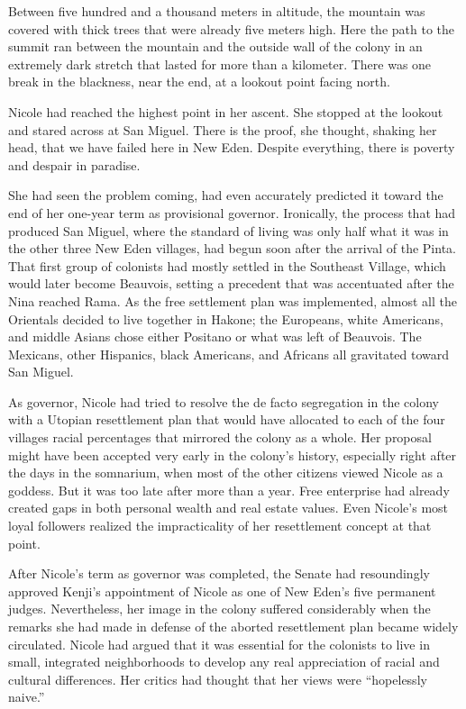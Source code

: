 \documentclass[]{article}
\begin{document}
{Between five hundred and a thousand meters in altitude, the mountain was covered with thick trees that were already five meters high. Here the path to the summit ran between the mountain and the outside wall of the colony in an extremely dark stretch that lasted for more than a kilometer. There was one break in the blackness, near the end, at a lookout point facing north.

Nicole had reached the highest point in her ascent. She stopped at the lookout and stared across at San Miguel. There is the proof, she thought, shaking her head, that we have failed here in New Eden. Despite everything, there is poverty and despair in paradise.

She had seen the problem coming, had even accurately predicted it toward the end of her one-year term as provisional governor. Ironically, the process that had produced San Miguel, where the standard of living was only half what it was in the other three New Eden villages, had begun soon after the arrival of the Pinta. That first group of colonists had mostly settled in the Southeast Village, which would later become Beauvois, setting a precedent that was accentuated after the Nina reached Rama. As the free settlement plan was implemented, almost all the Orientals decided to live together in Hakone; the Europeans, white Americans, and middle Asians chose either Positano or what was left of Beauvois. The Mexicans, other Hispanics, black Americans, and Africans all gravitated toward San Miguel.

As governor, Nicole had tried to resolve the de facto segregation in the colony with a Utopian resettlement plan that would have allocated to each of the four villages racial percentages that mirrored the colony as a whole. Her proposal might have been accepted very early in the colony’s history, especially right after the days in the somnarium, when most of the other citizens viewed Nicole as a goddess. But it was too late after more than a year. Free enterprise had already created gaps in both personal wealth and real estate values. Even Nicole’s most loyal followers realized the impracticality of her resettlement concept at that point.

After Nicole’s term as governor was completed, the Senate had resoundingly approved Kenji’s appointment of Nicole as one of New Eden’s five permanent judges. Nevertheless, her image in the colony suffered considerably when the remarks she had made in defense of the aborted resettlement plan became widely circulated. Nicole had argued that it was essential for the colonists to live in small, integrated neighborhoods to develop any real appreciation of racial and cultural differences. Her critics had thought that her views were “hopelessly naive.”

}
\end{document}
